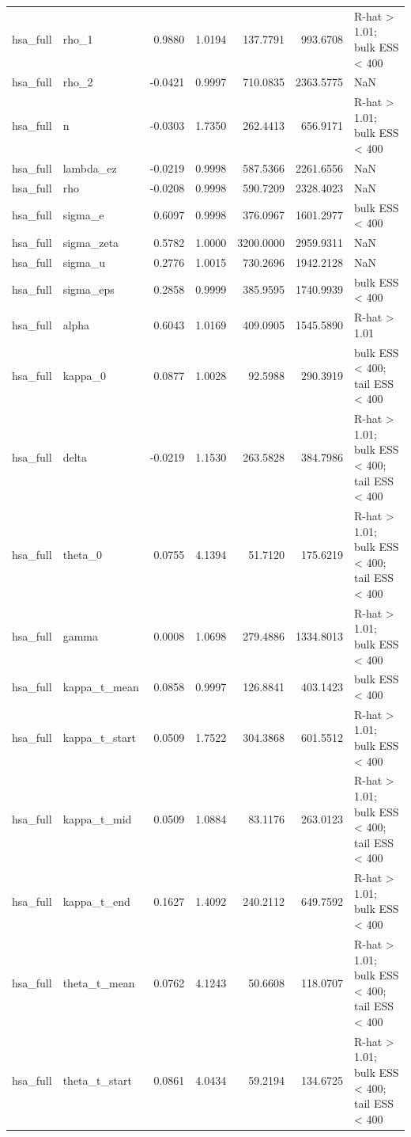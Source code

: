 \begin{tabular}{llrrrrl}
hsa\_full & rho\_1 & 0.9880 & 1.0194 & 137.7791 & 993.6708 & R-hat > 1.01; bulk ESS < 400 \\
hsa\_full & rho\_2 & -0.0421 & 0.9997 & 710.0835 & 2363.5775 & NaN \\
hsa\_full & n & -0.0303 & 1.7350 & 262.4413 & 656.9171 & R-hat > 1.01; bulk ESS < 400 \\
hsa\_full & lambda\_ez & -0.0219 & 0.9998 & 587.5366 & 2261.6556 & NaN \\
hsa\_full & rho & -0.0208 & 0.9998 & 590.7209 & 2328.4023 & NaN \\
hsa\_full & sigma\_e & 0.6097 & 0.9998 & 376.0967 & 1601.2977 & bulk ESS < 400 \\
hsa\_full & sigma\_zeta & 0.5782 & 1.0000 & 3200.0000 & 2959.9311 & NaN \\
hsa\_full & sigma\_u & 0.2776 & 1.0015 & 730.2696 & 1942.2128 & NaN \\
hsa\_full & sigma\_eps & 0.2858 & 0.9999 & 385.9595 & 1740.9939 & bulk ESS < 400 \\
hsa\_full & alpha & 0.6043 & 1.0169 & 409.0905 & 1545.5890 & R-hat > 1.01 \\
hsa\_full & kappa\_0 & 0.0877 & 1.0028 & 92.5988 & 290.3919 & bulk ESS < 400; tail ESS < 400 \\
hsa\_full & delta & -0.0219 & 1.1530 & 263.5828 & 384.7986 & R-hat > 1.01; bulk ESS < 400; tail ESS < 400 \\
hsa\_full & theta\_0 & 0.0755 & 4.1394 & 51.7120 & 175.6219 & R-hat > 1.01; bulk ESS < 400; tail ESS < 400 \\
hsa\_full & gamma & 0.0008 & 1.0698 & 279.4886 & 1334.8013 & R-hat > 1.01; bulk ESS < 400 \\
hsa\_full & kappa\_t\_mean & 0.0858 & 0.9997 & 126.8841 & 403.1423 & bulk ESS < 400 \\
hsa\_full & kappa\_t\_start & 0.0509 & 1.7522 & 304.3868 & 601.5512 & R-hat > 1.01; bulk ESS < 400 \\
hsa\_full & kappa\_t\_mid & 0.0509 & 1.0884 & 83.1176 & 263.0123 & R-hat > 1.01; bulk ESS < 400; tail ESS < 400 \\
hsa\_full & kappa\_t\_end & 0.1627 & 1.4092 & 240.2112 & 649.7592 & R-hat > 1.01; bulk ESS < 400 \\
hsa\_full & theta\_t\_mean & 0.0762 & 4.1243 & 50.6608 & 118.0707 & R-hat > 1.01; bulk ESS < 400; tail ESS < 400 \\
hsa\_full & theta\_t\_start & 0.0861 & 4.0434 & 59.2194 & 134.6725 & R-hat > 1.01; bulk ESS < 400; tail ESS < 400 \\

\end{tabular}
